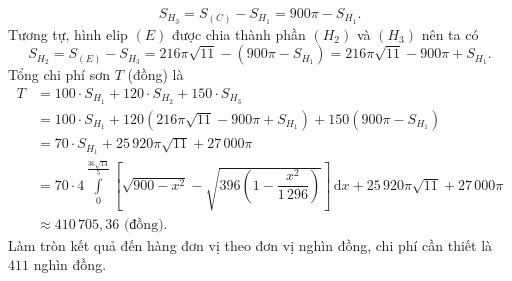 \begin{ex}
{		\[S_{H_3} = S_{(C)} - S_{H_1} = 900\pi - S_{H_1}. \]
		Tương tự, hình elip $(E)$ được chia thành phần $(H_2)$ và $(H_3)$ nên ta có
		\[S_{H_2} = S_{(E)} - S_{H_3} = 216\pi\sqrt{11} - \left(900\pi - S_{H_1}\right) = 216\pi\sqrt{11} - 900\pi + S_{H_1}. \]
		Tổng chi phí sơn $T$ (đồng) là
		\allowdisplaybreaks
		\begin{align*}
			T &= 100 \cdot S_{H_1} + 120 \cdot S_{H_2} + 150 \cdot S_{H_3} \\
			&= 100 \cdot S_{H_1} + 120 \left(216\pi\sqrt{11} - 900\pi + S_{H_1} \right) + 150 \left(900\pi - S_{H_1} \right) \\
			&= 70 \cdot S_{H_1} + 25\,920\pi\sqrt{11} + 27\,000\pi \\
			&= 70 \cdot 4 \int\limits_0^{\frac{36\sqrt{14}}{5}} \left[\sqrt{900 - x^2} - \sqrt{396\left(1 - \dfrac{x^2}{1\,296}\right)} \right] \mathrm{\,d}x + 25\,920\pi\sqrt{11} + 27\,000\pi \\
			&\approx 410\,705{,}36 \text{ (đồng)}.
		\end{align*}
		Làm tròn kết quả đến hàng đơn vị theo đơn vị nghìn đồng, chi phí cần thiết là $411$ nghìn đồng.
	}
\end{ex}

